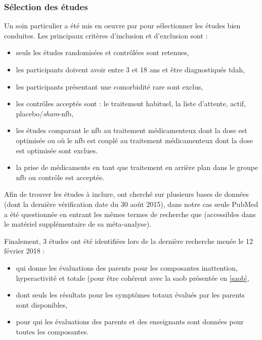 \subsubsection{Sélection des études}
Un soin particulier a été mis en oeuvre par \citet{Cortese2016} pour sélectionner les études bien conduites. Les principaux critères d'inclusion
et d'exclusion sont \citep{Cortese2016} :
\begin{itemize}
\item seuls les études randomisées et contrôlées sont retenues,
\item les participants doivent avoir entre 3 et 18 ans et être diagnostiqués \gls{tdah},
\item les participants présentant une comorbidité rare sont exclus,
\item les contrôles acceptés sont : le traitement habituel, la liste d'attente, actif, placebo/\textit{sham}-\gls{nfb},
\item les études comparant le \gls{nfb} au traitement médicamenteux dont la dose est optimisée ou où le \gls{nfb} est couplé au traitement médicamenteux
dont la dose est optimisée sont exclues.
\item la prise de médicaments en tant que traitement en arrière plan dans le groupe \gls{nfb} ou contrôle est acceptée.
\end{itemize}

Afin de trouver les études à inclure, \citet{Cortese2016} ont cherché sur plusieurs bases de données (dont la dernière vérification
date du 30 août 2015), dans notre cas seule PubMed a été questionnée en
entrant les mêmes termes de recherche que \citet{Cortese2016} (accessibles dans le matériel supplémentaire de sa méta-analyse).

Finalement, 3 études ont été identifiées lors de la dernière recherche menée le 12 février 2018 : 
\begin{itemize}
\item \citep{Bazanova2018} qui donne les évaluations des parents pour les composantes inattention, hyperactivité et totale (pour être cohérent avec 
la \gls{saob} présentée en \ref{saob},
\item \citep{Baumeister2016} dont seuls les résultats pour les symptômes totaux évalués par les parents sont disponibles,
\item \citep{Strehl2017} pour qui les évaluations des parents et des enseignants sont données pour toutes les composantes.
\end{itemize}

